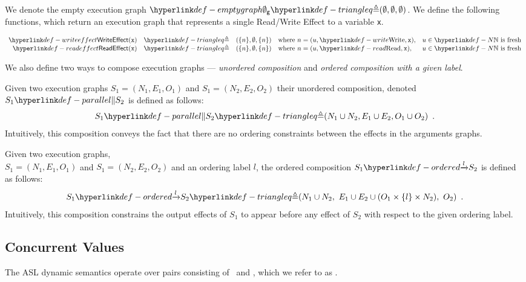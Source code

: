We denote the empty execution graph $\emptygraph \triangleq (\emptyset, \emptyset, \emptyset)$.
%
We define the following functions, which return an execution graph that represents a single Read/Write Effect to a variable \texttt{x}.
\hypertarget{def-writeeffect}{}
\hypertarget{def-readeffect}{}
\begin{definition}
\[
  \begin{array}{rclll}
    \WriteEffect(\vx) &\triangleq& (\{n\}, \emptyset, \{n\}) & \text{where } n=(u, \Write, \vx), & u\in\N \text{ is fresh}\\
    \ReadEffect(\vx)  &\triangleq& (\{n\}, \emptyset, \{n\}) & \text{where } n=(u, \Read, \vx),   & u\in\N \text{ is fresh}\\
  \end{array}
\]
\end{definition}

We also define two ways to compose execution graphs --- \emph{unordered composition} and
\emph{ordered composition with a given label}.

\hypertarget{def-parallel}{}
\begin{definition}
Given two execution graphs $S_1 = (N_1, E_1, O_1)$ and $S_1 = (N_2, E_2, O_2)$ their unordered composition,
denoted $S_1 \parallelcomp S_2$ is defined as follows:
\[
  S_1 \parallelcomp S_2\triangleq (N_1 \cup N_2, E_1 \cup E_2, O_1 \cup O_2) \enspace.
\]
Intuitively, this composition conveys the fact that there are no ordering constraints between the effects
in the arguments graphs.
\end{definition}

\hypertarget{def-ordered}{}
\begin{definition}
Given two execution graphs, \\ $S_1 = (N_1, E_1, O_1)$ and $S_1 = (N_2, E_2, O_2)$ and an ordering label $l$,
the ordered composition $\ordered{S_1}{l}{S_2}$ is defined as follows:
\[
  \ordered{S_1}{l}{S_2} \triangleq (N_1 \cup N_2,\ E_1 \cup E_2 \cup (O_1 \times \{l\} \times N_2),\ O_2) \enspace.
\]
Intuitively, this composition constrains the output effects of $S_1$ to appear before any effect of $S_2$ with respect
to the given ordering label.
\end{definition}

\subsection{Concurrent Values\label{sec:ConcurrentValues}}
\hypertarget{def-concurrentnativevalue}{}
The ASL dynamic semantics operate over pairs consisting of \nativevalues\ and \executiongraphs,
which we refer to as \concurrentnativevalues.


